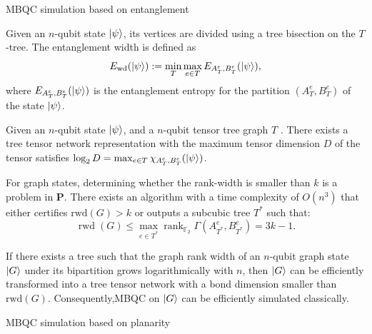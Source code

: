 \documentclass{beamer}
\begin{document}
\begin{frame}[allowframebreaks]{MBQC simulation based on entanglement~\cite{van2007classical}}
\begin{definition}
    Given an \( n \)-qubit state \( \ket{\psi} \), its vertices are divided using a tree bisection on the \( T \)-tree. The entanglement width is defined as
\[
E_{\mathrm{wd}}(\ket{\psi}) := \min_T \max_{e \in T} E_{A_T^e, B_T^e}(\ket{\psi}),
\]
where \( E_{A_T^e, B_T^e}(\ket{\psi}) \) is the entanglement entropy for the partition \( (A_T^e, B_T^e) \) of the state \( \ket{\psi} \).
\end{definition}
\begin{theorem}
Given an \( n \)-qubit state \( \ket{\psi} \), and a \( n \)-qubit tensor tree graph \( T \) . There exists a tree tensor network representation with the maximum tensor dimension \( D \) of the tensor satisfies $\log_2 D = \max_{e \in T} \chi_{A_T^e, B_T^e}(\ket{\psi})$.
\end{theorem}
\newpage
\begin{theorem}
For graph states, determining whether the rank-width is smaller than $k$ is a problem in $\textbf{P}$. There exists an algorithm with a time complexity of $O(n^3)$ that either certifies $\text{rwd}(G) > k$ or outputs a subcubic tree $T^*$ such that:
\[
\operatorname{rwd}(G) \leq \max_{e \in T^*} \operatorname{rank}_{\mathbb{F}_2} \Gamma(A_{T^*}^e, B_{T^*}^e) = 3k - 1.
\]
\end{theorem}
\begin{theorem}
    If there exists a tree such that the graph rank width of an $n$-qubit graph state $\ket{G}$ under its bipartition grows logarithmically with $n$, then $\ket{G}$ can be efficiently transformed into a tree tensor network with a bond dimension smaller than $\text{rwd}(G)$. Consequently,MBQC on $\ket{G}$ can be efficiently simulated classically.
\end{theorem}
\end{frame}

\begin{frame}{MBQC simulation based on planarity}

\end{frame}
\end{document}
